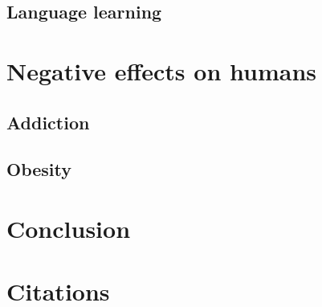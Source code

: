 \documentclass[10pt,twoside,english,a4paper]{article}
\begin{document}
\subsection{Language learning}


\section{Negative effects on humans}
\subsection{Addiction}
\subsection{Obesity}


\section{Conclusion} \label{conclusion}

\section{Citations} \label{cit} 
~\cite{school,behavior,education,empathy,problems,poz-neg-sol,language}





\end{document}
